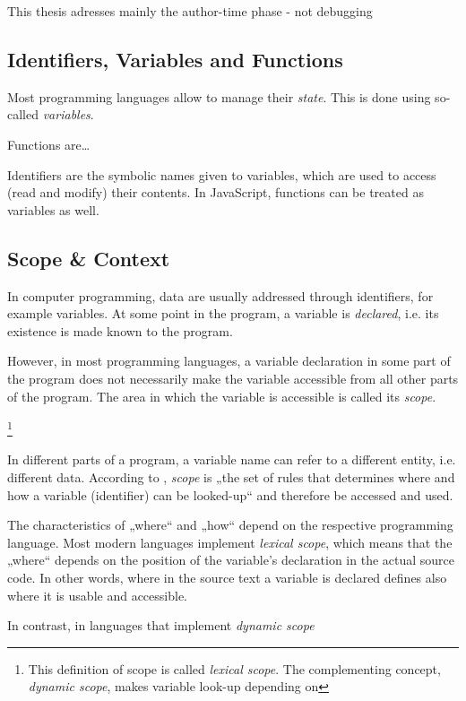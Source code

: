 This thesis adresses mainly the author-time phase - not debugging

\subsection{Identifiers, Variables and
Functions}\label{identifiers-variables-and-functions}

Most programming languages allow to manage their \emph{state}. This is
done using so-called \emph{variables}.

Functions are\ldots{}

Identifiers are the symbolic names given to variables, which are used to
access (read and modify) their contents. In JavaScript, functions can be
treated as variables as well.

\subsection{Scope \& Context}\label{scope-context}

In computer programming, data are usually addressed through identifiers,
for example variables. At some point in the program, a variable is
\emph{declared}, i.e. its existence is made known to the program.

However, in most programming languages, a variable declaration in some
part of the program does not necessarily make the variable accessible
from all other parts of the program. The area in which the variable is
accessible is called its \emph{scope}.

\footnote{This definition of scope is called \emph{lexical scope}. The
  complementing concept, \emph{dynamic scope}, makes variable look-up
  depending on}

In different parts of a program, a variable name can refer to a
different entity, i.e. different data. According to ,
\emph{scope} is „the set of rules that determines where and how a
variable (identifier) can be looked-up“ and therefore be accessed and
used.

The characteristics of „where“ and „how“ depend on the respective
programming language. Most modern languages implement \emph{lexical
scope}, which means that the „where“ depends on the position of the
variable’s declaration in the actual source code. In other words, where
in the source text a variable is declared defines also where it is
usable and accessible.

In contrast, in languages that implement \emph{dynamic scope}

